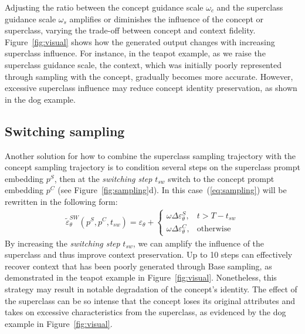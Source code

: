 Adjusting the ratio between the concept guidance scale $\omega_c$ and the superclass guidance scale $\omega_s$ amplifies or diminishes the influence of the concept or superclass, varying the trade-off between concept and context fidelity. Figure~\ref{fig:visual} shows how the generated output changes with increasing superclass influence. For instance, in the teapot example, as we raise the superclass guidance scale, the context, which was initially poorly represented through sampling with the concept, gradually becomes more accurate. However, excessive superclass influence may reduce concept identity preservation, as shown in the dog example.

\subsection{Switching sampling} \label{sec:switching_sampling}
Another solution for how to combine the superclass sampling trajectory with the concept sampling trajectory is to condition several steps on the superclass prompt embedding $p^S$, then at the \textit{switching step} $t_{sw}$ switch to the concept prompt embedding $p^C$  (see Figure~\ref{fig:sampling}d). In this case~(\ref{eq:sampling}) will be rewritten in the following form:
\begin{align}\label{eq:switching_sampling}
    \tilde{\varepsilon}^{SW}_{\theta}(p^S, p^C, t_{sw}) = \varepsilon_{\theta} +
    \begin{cases}
         \omega\Delta\varepsilon_{\theta}^{S}, & t > T - t_{sw}\\
        \omega\Delta\varepsilon_{\theta}^{C}, &\text{otherwise}
    \end{cases} 
\end{align}
By increasing the \textit{switching step} $t_{sw}$, we can amplify the influence of the superclass and thus improve context preservation.
Up to 10 steps can effectively recover context that has been poorly generated through Base sampling, as demonstrated in the teapot example in Figure~\ref{fig:visual}. Nonetheless, this strategy may result in notable degradation of the concept's identity. The effect of the superclass can be so intense that the concept loses its original attributes and takes on excessive characteristics from the superclass, as evidenced by the dog example in Figure~\ref{fig:visual}.


